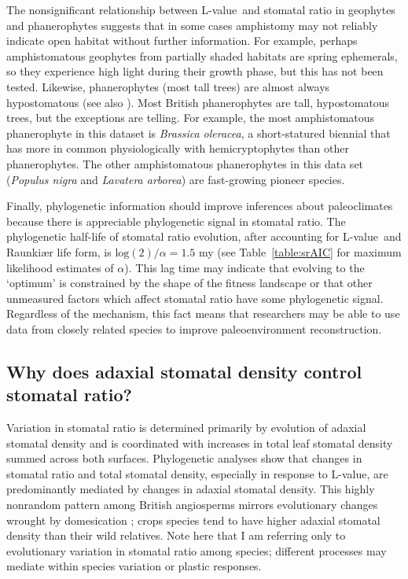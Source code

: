 \documentclass[12pt, oneside]{article}
\newcommand{\el}{L-value}
\begin{document}
The nonsignificant relationship between \el~and stomatal ratio in geophytes and phanerophytes suggests that in some cases amphistomy may not reliably indicate open habitat without further information. For example, perhaps amphistomatous geophytes from partially shaded habitats are spring ephemerals, so they  experience high light during their growth phase, but this has not been tested. Likewise, phanerophytes (most tall trees) are almost always hypostomatous (see also \cite{Muir_2015}). Most British phanerophytes are tall, hypostomatous trees, but the exceptions are telling. For example, the most amphistomatous phanerophyte in this dataset is \textit{Brassica oleracea}, a short-statured biennial that has more in common physiologically with hemicryptophytes than other phanerophytes. The other amphistomatous phanerophytes in this data set (\textit{Populus nigra} and \textit{Lavatera arborea}) are fast-growing pioneer species.

Finally, phylogenetic information should improve inferences about paleoclimates because there is appreciable phylogenetic signal in stomatal ratio. The phylogenetic half-life of stomatal ratio evolution, after accounting for \el~and Raunki\ae r life form, is $\mathrm{log}(2) / \alpha = 1.5$ my (see Table~\ref{table:srAIC} for maximum likelihood estimates of $\alpha$). This lag time may indicate that evolving to the `optimum' is constrained by the shape of the fitness landscape \citep{Muir_2015} or that other unmeasured factors which affect stomatal ratio have some phylogenetic signal. Regardless of the mechanism, this fact means that researchers may be able to use data from closely related species to improve paleoenvironment reconstruction.


\subsection*{Why does adaxial stomatal density control stomatal ratio?}

Variation in stomatal ratio is determined primarily by evolution of adaxial stomatal density and is coordinated with increases in total leaf stomatal density summed across both surfaces. Phylogenetic analyses show that changes in stomatal ratio and total stomatal density, especially in response to \el, are predominantly mediated by changes in adaxial stomatal density. This highly nonrandom pattern among British angiosperms mirrors evolutionary changes wrought by domesication \citep{Milla_etal_2013}; crops species tend to have higher adaxial stomatal density than their wild relatives. Note here that I am referring only to evolutionary variation in stomatal ratio among species; different processes may mediate within species variation or plastic responses.
\end{document}
